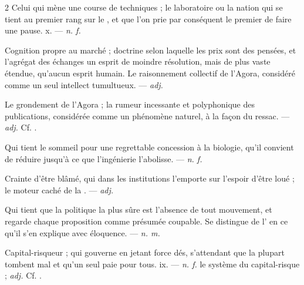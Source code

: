 \begin{multicols}{2}
 Celui qui mène une course de techniques ; le laboratoire ou la nation qui se tient au premier rang sur le , et que l'on prie par conséquent le premier de faire une pause.   x. —  \textit{n. f.}

  Cognition propre au marché ; doctrine selon laquelle les prix sont des pensées, et l'agrégat des échanges un esprit de moindre résolution, mais de plus vaste étendue, qu'aucun esprit humain.   Le raisonnement collectif de l'Agora, considéré comme un seul intellect tumultueux. —  \textit{adj.}

 Le grondement de l'Agora ; la rumeur incessante et polyphonique des publications, considérée comme un phénomène naturel, à la façon du ressac.  —  \textit{adj.} Cf. .

 Qui tient le sommeil pour une regrettable concession à la biologie, qu'il convient de réduire jusqu'à ce que l'ingénierie l'abolisse.  —  \textit{n. f.}

 Crainte d'être blâmé, qui dans les institutions l'emporte sur l'espoir d'être loué ; le moteur caché de la . —  \textit{adj.}

 Qui tient que la politique la plus sûre est l'absence de tout mouvement, et regarde chaque proposition comme présumée coupable. Se distingue de l' en ce qu'il s'en explique avec éloquence. —  \textit{n. m.}

 Capital-risqueur ; qui gouverne en jetant force dés, s'attendant que la plupart tombent mal et qu'un seul paie pour tous.   ix. —  \textit{n. f.} le système du capital-risque ;  \textit{adj.} Cf. .


\end{multicols}
